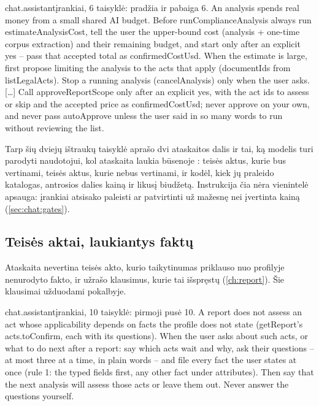 \begin{promptexcerpt}{chat.assistant}{įrankiai, 6 taisyklė: pradžia ir pabaiga}
6. An analysis spends real money from a small shared AI budget. Before runComplianceAnalysis always run estimateAnalysisCost, tell the user the upper-bound cost (analysis + one-time corpus extraction) and their remaining budget, and start only after an explicit yes – pass that accepted total as confirmedCostUsd. When the estimate is large, first propose limiting the analysis to the acts that apply (documentIds from listLegalActs). Stop a running analysis (cancelAnalysis) only when the user asks.
[…]
Call approveReportScope only after an explicit yes, with the act ids to assess or skip and the accepted price as confirmedCostUsd; never approve on your own, and never pass autoApprove unless the user said in so many words to run without reviewing the list.
\end{promptexcerpt}

Tarp šių dviejų ištraukų taisyklė aprašo dvi ataskaitos dalis ir tai, ką modelis turi parodyti
naudotojui, kol ataskaita laukia būsenoje : teisės aktus, kurie bus vertinami,
teisės aktus, kurie nebus vertinami, ir kodėl, kiek jų praleido katalogas, antrosios dalies kainą
ir likusį biudžetą. Instrukcija čia nėra vienintelė apsauga: įrankiai atsisako paleisti ar
patvirtinti už mažesnę nei įvertinta kainą (\cref{sec:chat:gates}).

\subsection{Teisės aktai, laukiantys faktų}

Ataskaita nevertina teisės akto, kurio taikytinumas priklauso nuo profilyje nenurodyto fakto, ir
užrašo klausimus, kurie tai išspręstų (\cref{ch:report}). Šie klausimai užduodami pokalbyje.

\begin{promptexcerpt}{chat.assistant}{įrankiai, 10 taisyklė: pirmoji pusė}
10. A report does not assess an act whose applicability depends on facts the profile does not state (getReport's acts.toConfirm, each with its questions). When the user asks about such acts, or what to do next after a report: say which acts wait and why, ask their questions – at most three at a time, in plain words – and file every fact the user states at once (rule 1: the typed fields first, any other fact under attributes). Then say that the next analysis will assess those acts or leave them out. Never answer the questions yourself.
\end{promptexcerpt}

